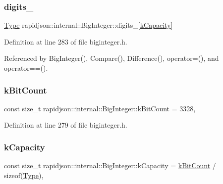 \subsubsection{\texorpdfstring{digits\_}{digits\_}}
{\footnotesize\ttfamily \mbox{\hyperlink{classrapidjson_1_1internal_1_1_big_integer_a37d8e8c111f0d76fa07bb4da4790514d}{Type}} rapidjson\+::internal\+::\+Big\+Integer\+::digits\+\_\+\mbox{[}\mbox{\hyperlink{classrapidjson_1_1internal_1_1_big_integer_aad4550b1fb2215bbbdc92f1773bc988c}{k\+Capacity}}\mbox{]}\hspace{0.3cm}{\ttfamily [private]}}



Definition at line 283 of file biginteger.\+h.



Referenced by Big\+Integer(), Compare(), Difference(), operator=(), and operator==().

\mbox{\label{classrapidjson_1_1internal_1_1_big_integer_aef84cafb23eff42fdca40ef9d9fc7f98}} 
\subsubsection{\texorpdfstring{kBitCount}{kBitCount}}
{\footnotesize\ttfamily const size\+\_\+t rapidjson\+::internal\+::\+Big\+Integer\+::k\+Bit\+Count = 3328\hspace{0.3cm}{\ttfamily [static]}, {\ttfamily [private]}}



Definition at line 279 of file biginteger.\+h.

\mbox{\label{classrapidjson_1_1internal_1_1_big_integer_aad4550b1fb2215bbbdc92f1773bc988c}} 
\subsubsection{\texorpdfstring{kCapacity}{kCapacity}}
{\footnotesize\ttfamily const size\+\_\+t rapidjson\+::internal\+::\+Big\+Integer\+::k\+Capacity = \mbox{\hyperlink{classrapidjson_1_1internal_1_1_big_integer_aef84cafb23eff42fdca40ef9d9fc7f98}{k\+Bit\+Count}} / sizeof(\mbox{\hyperlink{classrapidjson_1_1internal_1_1_big_integer_a37d8e8c111f0d76fa07bb4da4790514d}{Type}})\hspace{0.3cm}{\ttfamily [static]}, {\ttfamily [private]}}



